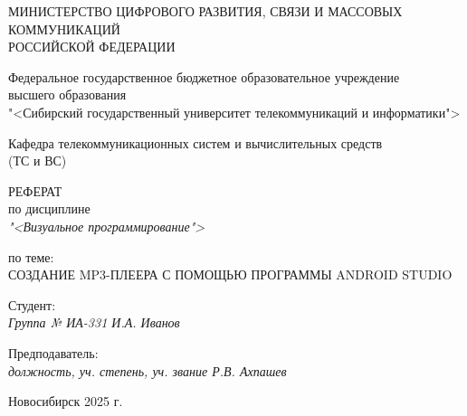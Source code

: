\thispagestyle{empty}

\begin{center}
    МИНИСТЕРСТВО ЦИФРОВОГО РАЗВИТИЯ, СВЯЗИ И МАССОВЫХ КОММУНИКАЦИЙ \\ РОССИЙСКОЙ ФЕДЕРАЦИИ

    \vspace{20pt}

    Федеральное государственное бюджетное образовательное учреждение  \\  высшего образования \\
    "<Сибирский государственный университет телекоммуникаций и информатики"> \\

    \vspace{20pt}

    Кафедра телекоммуникационных систем и вычислительных средств \\  (ТС и ВС)
\end{center}

\vfill

\begin{center}
    РЕФЕРАТ \\  
    по дисциплине \\
    \textit{"<Визуальное программирование">}

    \vspace{20pt}

    по теме: \\
    \uppercase{Создание MP3-плеера с помощью программы Android Studio}
\end{center}

\vfill

    \noindent Студент: \\
    \textit{Группа № ИА-331 \hfill И.А. Иванов}

    \vspace{20pt}

    \noindent Предподаватель: \\
    \textit{должность, уч. степень, уч. звание \hfill Р.В. Ахпашев}

\vfill

\begin{center}
    Новосибирск 2025 г.
\end{center}